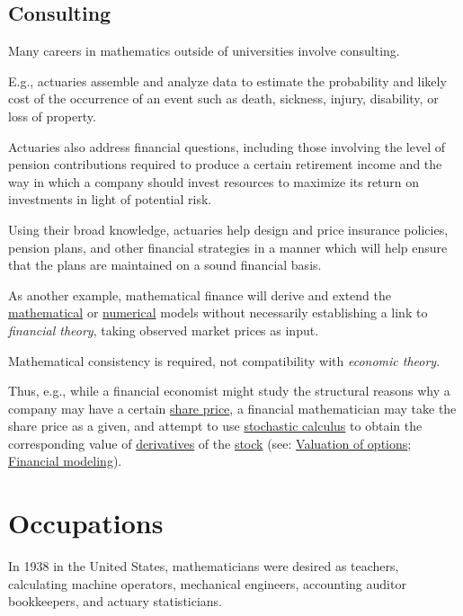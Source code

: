 \documentclass{book}
\numberwithin{equation}{section}
\begin{document}
\subsection{Consulting}
Many careers in mathematics outside of universities involve consulting.

E.g., actuaries assemble and analyze data to estimate the probability and likely cost of the occurrence of an event such as death, sickness, injury, disability, or loss of property.

Actuaries also address financial questions, including those involving the level of pension contributions required to produce a certain retirement income and the way in which a company should invest resources to maximize its return on investments in light of potential risk.

Using their broad knowledge, actuaries help design and price insurance policies, pension plans, and other financial strategies in a manner which will help ensure that the plans are maintained on a sound financial basis.

%
As another example, mathematical finance will derive and extend the \href{https://en.wikipedia.org/wiki/Mathematical_model}{mathematical} or \href{https://en.wikipedia.org/wiki/Numerical_analysis}{numerical} models without necessarily establishing a link to \textit{financial theory}, taking observed market prices as input.

Mathematical consistency is required, not compatibility with \textit{economic theory}.

Thus, e.g., while a financial economist might study the structural reasons why a company may have a certain \href{https://en.wikipedia.org/wiki/Share_price}{share price}, a financial mathematician may take the share price as a given, and attempt to use \href{https://en.wikipedia.org/wiki/Stochastic_calculus}{stochastic calculus} to obtain the corresponding value of \href{https://en.wikipedia.org/wiki/Derivative_(finance)}{derivatives} of the \href{https://en.wikipedia.org/wiki/Stock}{stock} (see: \href{https://en.wikipedia.org/wiki/Valuation_of_options}{Valuation of options}; \href{https://en.wikipedia.org/wiki/Financial_modeling#Quantitative_finance}{Financial modeling}).

\section{Occupations}
\textsf{In 1938 in the United States, mathematicians were desired as teachers, calculating machine operators, mechanical engineers, accounting auditor bookkeepers, and actuary statisticians.}
\end{document}
